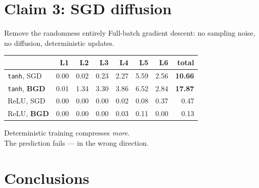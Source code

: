 \documentclass[aspectratio=169,11pt]{beamer}
\begin{document}
\section{Claim 3: SGD diffusion}

\begin{frame}{Remove the randomness entirely}
Full-batch gradient descent: no sampling noise, no diffusion, deterministic updates.
\bigskip
\centering
\small
\begin{tabular}{lrrrrrrr}
\toprule
& L1 & L2 & L3 & L4 & L5 & L6 & \textbf{total} \\
\midrule
\texttt{tanh}, SGD & 0.00 & 0.02 & 0.23 & 2.27 & 5.59 & 2.56 & \textbf{10.66} \\
\texttt{tanh}, \textbf{BGD} & 0.01 & 1.34 & 3.30 & 3.86 & 6.52 & 2.84 & \textcolor{bad}{\textbf{17.87}} \\
ReLU, SGD & 0.00 & 0.00 & 0.00 & 0.02 & 0.08 & 0.37 & 0.47 \\
ReLU, \textbf{BGD} & 0.00 & 0.00 & 0.00 & 0.03 & 0.11 & 0.00 & 0.13 \\
\bottomrule
\end{tabular}
\bigskip
\begin{center}
\Large Deterministic training compresses \emph{more}.\\[3pt]
\normalsize The prediction fails --- in the wrong direction.
\end{center}
\end{frame}

\section{Conclusions}
\end{document}
